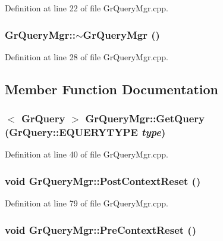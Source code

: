 Definition at line 22 of file GrQueryMgr.cpp.\hypertarget{class_gr_query_mgr_f24c1acf4e5607b6b4e3b9162e9ca29b}{
\subsubsection[{$\sim$GrQueryMgr}]{\setlength{\rightskip}{0pt plus 5cm}GrQueryMgr::$\sim$GrQueryMgr ()}}
\label{class_gr_query_mgr_f24c1acf4e5607b6b4e3b9162e9ca29b}




Definition at line 28 of file GrQueryMgr.cpp.

\subsection{Member Function Documentation}
\hypertarget{class_gr_query_mgr_5f3da3199e15d693b707d9df1a52cef2}{
\subsubsection[{GetQuery}]{$<$ {\bf GrQuery} $>$ GrQueryMgr::GetQuery ({\bf GrQuery::EQUERYTYPE} {\em type})}}
\label{class_gr_query_mgr_5f3da3199e15d693b707d9df1a52cef2}




Definition at line 40 of file GrQueryMgr.cpp.\hypertarget{class_gr_query_mgr_7907b96bf873f4bec95328827e2a5641}{
\subsubsection[{PostContextReset}]{\setlength{\rightskip}{0pt plus 5cm}void GrQueryMgr::PostContextReset ()}}
\label{class_gr_query_mgr_7907b96bf873f4bec95328827e2a5641}




Definition at line 79 of file GrQueryMgr.cpp.\hypertarget{class_gr_query_mgr_30c18b0691192febe70d2e670a791451}{
\subsubsection[{PreContextReset}]{\setlength{\rightskip}{0pt plus 5cm}void GrQueryMgr::PreContextReset ()}}
\label{class_gr_query_mgr_30c18b0691192febe70d2e670a791451}




